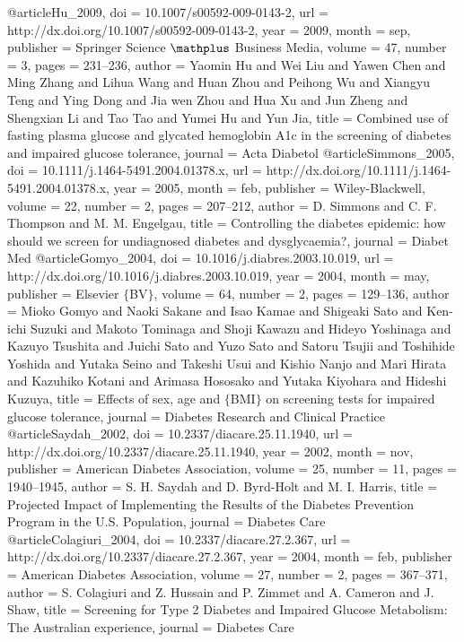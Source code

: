 @article{Hu_2009,
	doi = {10.1007/s00592-009-0143-2},
	url = {http://dx.doi.org/10.1007/s00592-009-0143-2},
	year = 2009,
	month = {sep},
	publisher = {Springer Science $\mathplus$ Business Media},
	volume = {47},
	number = {3},
	pages = {231--236},
	author = {Yaomin Hu and Wei Liu and Yawen Chen and Ming Zhang and Lihua Wang and Huan Zhou and Peihong Wu and Xiangyu Teng and Ying Dong and Jia wen Zhou and Hua Xu and Jun Zheng and Shengxian Li and Tao Tao and Yumei Hu and Yun Jia},
	title = {Combined use of fasting plasma glucose and glycated hemoglobin A1c in the screening of diabetes and impaired glucose tolerance},
	journal = {Acta Diabetol}
}
@article{Simmons_2005,
	doi = {10.1111/j.1464-5491.2004.01378.x},
	url = {http://dx.doi.org/10.1111/j.1464-5491.2004.01378.x},
	year = 2005,
	month = {feb},
	publisher = {Wiley-Blackwell},
	volume = {22},
	number = {2},
	pages = {207--212},
	author = {D. Simmons and C. F. Thompson and M. M. Engelgau},
	title = {Controlling the diabetes epidemic: how should we screen for undiagnosed diabetes and dysglycaemia?},
	journal = {Diabet Med}
}
@article{Gomyo_2004,
	doi = {10.1016/j.diabres.2003.10.019},
	url = {http://dx.doi.org/10.1016/j.diabres.2003.10.019},
	year = 2004,
	month = {may},
	publisher = {Elsevier $\lbrace$BV$\rbrace$},
	volume = {64},
	number = {2},
	pages = {129--136},
	author = {Mioko Gomyo and Naoki Sakane and Isao Kamae and Shigeaki Sato and Ken-ichi Suzuki and Makoto Tominaga and Shoji Kawazu and Hideyo Yoshinaga and Kazuyo Tsushita and Juichi Sato and Yuzo Sato and Satoru Tsujii and Toshihide Yoshida and Yutaka Seino and Takeshi Usui and Kishio Nanjo and Mari Hirata and Kazuhiko Kotani and Arimasa Hososako and Yutaka Kiyohara and Hideshi Kuzuya},
	title = {Effects of sex, age and $\lbrace$BMI$\rbrace$ on screening tests for impaired glucose tolerance},
	journal = {Diabetes Research and Clinical Practice}
}
@article{Saydah_2002,
	doi = {10.2337/diacare.25.11.1940},
	url = {http://dx.doi.org/10.2337/diacare.25.11.1940},
	year = 2002,
	month = {nov},
	publisher = {American Diabetes Association},
	volume = {25},
	number = {11},
	pages = {1940--1945},
	author = {S. H. Saydah and D. Byrd-Holt and M. I. Harris},
	title = {Projected Impact of Implementing the Results of the Diabetes Prevention Program in the U.S. Population},
	journal = {Diabetes Care}
}
@article{Colagiuri_2004,
	doi = {10.2337/diacare.27.2.367},
	url = {http://dx.doi.org/10.2337/diacare.27.2.367},
	year = 2004,
	month = {feb},
	publisher = {American Diabetes Association},
	volume = {27},
	number = {2},
	pages = {367--371},
	author = {S. Colagiuri and Z. Hussain and P. Zimmet and A. Cameron and J. Shaw},
	title = {Screening for Type 2 Diabetes and Impaired Glucose Metabolism: The Australian experience},
	journal = {Diabetes Care}
}
